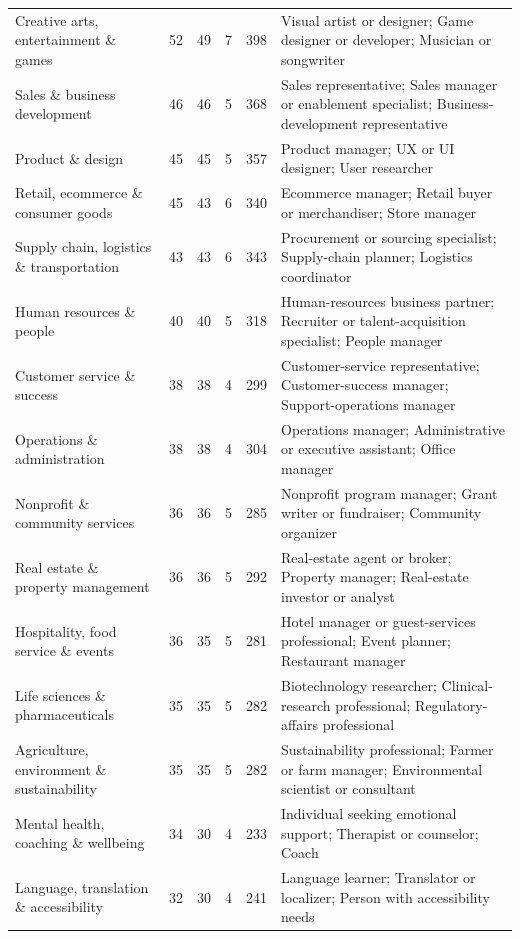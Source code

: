 \documentclass{article} %
\begin{document}
\begin{table}[p]
\begin{tabular}{@{}p{3.9cm}rrrrp{6.0cm}@{}}
Creative arts, entertainment \& games & 52 & 49 & 7 & 398 & Visual artist or designer; Game designer or developer; Musician or songwriter \\
Sales \& business development & 46 & 46 & 5 & 368 & Sales representative; Sales manager or enablement specialist; Business-development representative \\
Product \& design & 45 & 45 & 5 & 357 & Product manager; UX or UI designer; User researcher \\
Retail, ecommerce \& consumer goods & 45 & 43 & 6 & 340 & Ecommerce manager; Retail buyer or merchandiser; Store manager \\
Supply chain, logistics \& transportation & 43 & 43 & 6 & 343 & Procurement or sourcing specialist; Supply-chain planner; Logistics coordinator \\
Human resources \& people & 40 & 40 & 5 & 318 & Human-resources business partner; Recruiter or talent-acquisition specialist; People manager \\
Customer service \& success & 38 & 38 & 4 & 299 & Customer-service representative; Customer-success manager; Support-operations manager \\
Operations \& administration & 38 & 38 & 4 & 304 & Operations manager; Administrative or executive assistant; Office manager \\
Nonprofit \& community services & 36 & 36 & 5 & 285 & Nonprofit program manager; Grant writer or fundraiser; Community organizer \\
Real estate \& property management & 36 & 36 & 5 & 292 & Real-estate agent or broker; Property manager; Real-estate investor or analyst \\
Hospitality, food service \& events & 36 & 35 & 5 & 281 & Hotel manager or guest-services professional; Event planner; Restaurant manager \\
Life sciences \& pharmaceuticals & 35 & 35 & 5 & 282 & Biotechnology researcher; Clinical-research professional; Regulatory-affairs professional \\
Agriculture, environment \& sustainability & 35 & 35 & 5 & 282 & Sustainability professional; Farmer or farm manager; Environmental scientist or consultant \\
Mental health, coaching \& wellbeing & 34 & 30 & 4 & 233 & Individual seeking emotional support; Therapist or counselor; Coach \\
Language, translation \& accessibility & 32 & 30 & 4 & 241 & Language learner; Translator or localizer; Person with accessibility needs \\

\end{tabular}
\end{table}
\end{document}
